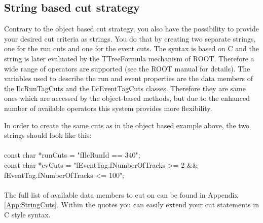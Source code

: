 \subsection{String based cut strategy}
Contrary to the object based cut strategy, you also have the possibility to provide your desired cut criteria as strings. You do that by creating two separate strings, one for the run cuts and one for the event cuts. The syntax is based on C and the string is later evaluated by the TTreeFormula mechanism of ROOT. Therefore a wide range of operators are supported (see the ROOT manual \cite{Note:ROOTManual} for details). The variables used to describe the run and event properties are the data members of the {\ttfamily IlcRunTagCuts} and the {\ttfamily IlcEventTagCuts} classes. Therefore they are same ones which are accessed by the object-based methods, but due to the enhanced number of available operators this system provides more flexibility.

In order to create the same cuts as in the object based example above, the two strings should look like this:\\
\\
{\ttfamily const char *runCuts = "fIlcRunId == 340";}\\
{\ttfamily const char *evCuts = "fEventTag.fNumberOfTracks >= 2 \&\&\\
fEventTag.fNumberOfTracks <= 100";}\\
\\
The full list of available data members to cut on can be found in Appendix\,\ref{App:StringCuts}. Within the quotes you can easily extend your cut statements in C style syntax.

